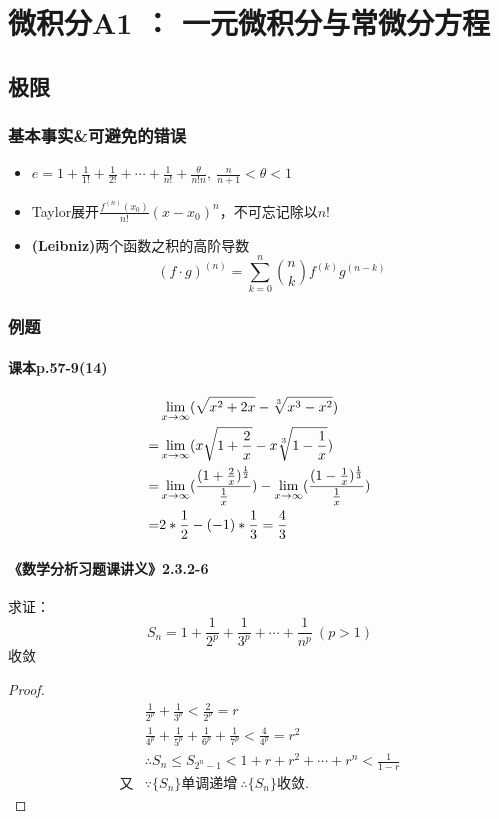 \documentclass[./main.tex]{subfiles}
\begin{document}
\chapter{微积分A1 ： 一元微积分与常微分方程}
\section{极限}
\subsection{基本事实\&可避免的错误}
\begin{itemize}
  \item $e=1+\frac{1}{1!}+\frac{1}{2!}+\cdots+\frac{1}{n!}+\frac{\theta}{n!n},\ \frac{n}{n+1}<\theta<1$
  \item Taylor展开$\frac{f^{(n)}(x_0)}{n!}(x-x_0)^n$，不可忘记除以$n!$
  \item \textbf{(Leibniz)}两个函数之积的高阶导数
  $$(f\cdot g)^{(n)}=\sum_{k=0}^n\binom{n}{k}f^{(k)}g^{(n-k)}$$
\end{itemize}
\subsection{例题}
\subsubsection{课本p.57-9(14)}\vspace{-2em}
\begin{align*}
  &\lim\limits_{x\rightarrow\infty}(\sqrt{x^2+2x}-\sqrt[3]{x^3-x^2})\\
  =&\lim\limits_{x\rightarrow \infty}(x\sqrt{1+\frac{2}{x}}-x\sqrt[3]{1-\frac{1}{x}})\\
  =&\lim\limits_{x\rightarrow \infty}(\frac{(1+\frac{2}{x})^\frac{1}{2}}{\frac{1}{x}})
  - \lim\limits_{x\rightarrow \infty}(\frac{(1-\frac{1}{x})^\frac{1}{3}}{\frac{1}{x}}) \\
  =&2*{1\over 2}-(-1)*\frac{1}{3}={4\over 3}
\end{align*}
\subsubsection{《数学分析习题课讲义》2.3.2-6}
\noindent 求证：
\begin{equation}
S_n=1+\frac{1}{2^p}+\frac{1}{3^p}+\cdots+\frac{1}{n^p}\ (p>1)
\end{equation}
收敛
\begin{proof}
\begin{align*}
&\frac{1}{2^p}+\frac{1}{3^p}<\frac{2}{2^p}=r\\
&\frac{1}{4^p}+\frac{1}{5^p}+\frac{1}{6^p}+\frac{1}{7^p}<\frac{4}{4^p}=r^2\\
&\therefore S_n\le S_{2^n-1}<1+r+r^2+\cdots+r^n<\frac{1}{1-r}\\
\text{又}&\because \{S_n\}\text{单调递增}\ \therefore \{S_n\}\text{收敛}.
\end{align*}
\end{proof}
\end{document}
